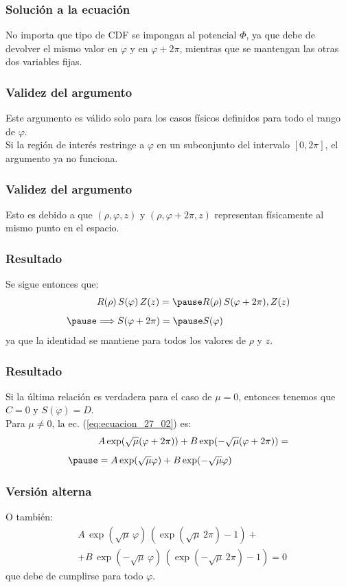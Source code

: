 \documentclass[12pt]{beamer}
\begin{document}
\begin{frame}
\frametitle{Solución a la ecuación}
No importa que tipo de CDF se impongan al potencial $\Phi$, \pause ya que debe de devolver el mismo valor en $\varphi$ y en $\varphi + 2 \pi$, mientras que se mantengan las otras dos variables fijas.
\end{frame}
\begin{frame}
\frametitle{Validez del argumento}
Este argumento es válido solo para los casos físicos definidos para todo el rango de $\varphi$. 
\\
\bigskip
\pause
Si la región de interés restringe a $\varphi$ en un subconjunto del intervalo $[0, 2 \pi]$, el argumento ya no funciona.
\end{frame}
\begin{frame}
\frametitle{Validez del argumento}
Esto es debido a que $(\rho, \varphi, z)$ y $(\rho, \varphi + 2 \pi, z)$ representan físicamente al mismo punto en el espacio.
\end{frame}
\begin{frame}
\frametitle{Resultado}
Se sigue entonces que:
\pause
\begin{eqnarray*}
&R(\rho) \, S(\varphi) \, Z(z) = \pause R(\rho)  \, S(\varphi + 2 \pi) , Z(z) \\[0.5em] \pause
&\Longrightarrow S(\varphi + 2 \pi) = \pause S (\varphi)
\end{eqnarray*}
ya que la identidad se mantiene para todos los valores de $\rho$ y $z$.
\end{frame}
\begin{frame}
\frametitle{Resultado}
Si la última relación es verdadera para el caso de $\mu = 0$, \pause entonces tenemos que $C = 0$ y $S(\varphi) = D$.
\\
\bigskip
\pause
Para $\mu \neq 0$, la ec. (\ref{eq:ecuacion_27_02}) es:
\pause
\begin{eqnarray*}
&A \exp(\sqrt{\mu}(\varphi + 2 \pi)) + B \exp(- \sqrt{\mu}(\varphi + 2 \pi)) = \\[0.5em] \pause
&= A \exp(\sqrt{\mu} \varphi) + B \exp(-\sqrt{\mu} \varphi)
\end{eqnarray*}
\end{frame}
\begin{frame}
\frametitle{Versión alterna}
O también:
\pause
\begin{align*}
&A \, \exp(\sqrt{\mu} \, \varphi) \, (\exp(\sqrt{\mu} \, 2 \pi) - 1) + \\[0.5em]
&+ B \, \exp(- \sqrt{\mu} \, \varphi) \, (\exp(- \sqrt{\mu} \, 2 \pi) - 1) = 0
\end{align*}
\pause
que debe de cumplirse para todo $\varphi$.
\end{frame}
\end{document}
